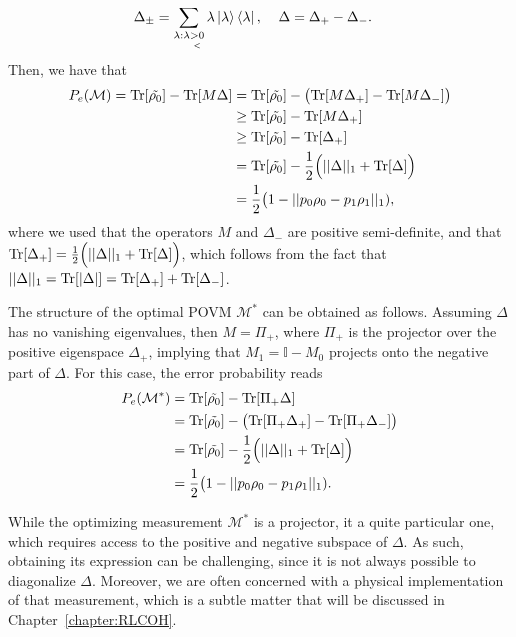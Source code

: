 \begin{align}
\Delta_\pm &= \sum_{\lambda : \lambda\underset{<}{>0}} \lambda \ket{\lambda}\bra{\lambda}, \spacee \Delta= \Delta_+ - \Delta_-.
\end{align}
Then, we have that
\begin{align}
P_e(\mathcal{M}) = \text{Tr}[\tilde{\rho_0}] - \text{Tr}[M \Delta] &=\text{Tr}[\tilde{\rho_0}]  - \big(\text{Tr}[M \Delta_+] -\text{Tr}[M \Delta_-]\big)\\ \nonumber
&\geq\text{Tr}[\tilde{\rho_0}]  - \text{Tr}[M \Delta_+]\\ \nonumber
&\geq\text{Tr}[\tilde{\rho_0}]  - \text{Tr}[\Delta_+]\\ \nonumber
&= \text{Tr}[\tilde{\rho_0}] - \frac{1}{2}\Big(|| \Delta ||_1 + \text{Tr}[\Delta]\Big) \\ \nonumber &=  \frac{1}{2}\big( 1 - ||p_0 \rho_0 - p_1 \rho_1 ||_1),\nonumber
\end{align}
where we used that the operators $M$ and $\Delta_-$ are positive semi-definite, and that $\text{Tr}[\Delta_+] = \frac{1}{2}\Big(|| \Delta ||_1 + \text{Tr}[\Delta]\Big)$, which follows from the fact that  $|| \Delta ||_1 = \text{Tr}[|\Delta|] = \text{Tr}[\Delta_+] + \text{Tr}[\Delta_-]$.

The structure of the optimal POVM $\mathcal{M}^*$ can be obtained as follows. Assuming $\Delta$ has no vanishing eigenvalues, then $M = \Pi_+$, where $\Pi_+$ is the projector over the positive eigenspace $\Delta_+$, implying that $M_1 = \mathbb{I} - M_0$ projects onto the negative part of $\Delta$. For this case, the error probability reads
\begin{align}\label{eq:1_qdisc_helstom}
P_e(\mathcal{M}^*) &= \text{Tr}[\tilde{\rho_0}] - \text{Tr}[\Pi_+ \Delta] \\ \nonumber
&=\text{Tr}[\tilde{\rho_0}]  - \big(\text{Tr}[\Pi_+ \Delta_+] -\text{Tr}[\Pi_+ \Delta_-]\big)\\ \nonumber
&= \text{Tr}[\tilde{\rho_0}] - \frac{1}{2}\Big(|| \Delta ||_1 + \text{Tr}[\Delta]\Big) \\ \nonumber
&= \frac{1}{2}\big( 1 - ||p_0 \rho_0 - p_1 \rho_1 ||_1). \nonumber
\end{align}

While the optimizing measurement $\mathcal{M}^*$ is a projector, it a quite particular one, which requires access to the positive and negative subspace of $\Delta$. As such, obtaining its expression can be challenging, since it is not always possible to diagonalize $\Delta$. Moreover, we are often concerned with a physical implementation of that measurement, which is a subtle matter that will be discussed in Chapter~\ref{chapter:RLCOH}.

